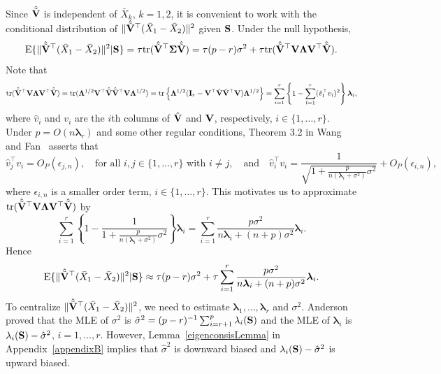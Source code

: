 \documentclass[times,sort&compress,3p]{elsarticle}
\newcommand{\mytr}{ {\rm tr} }
\newcommand{\myE}{ {\rm E} }
\newcommand{\bfsym}[1]{\ensuremath{\boldsymbol{#1}}}
\def\blambda {\bfsym {\lambda}}        \def\bLambda {\bfsym {\Lambda}}
\theoremstyle{plain}
\theoremstyle{definition}
\theoremstyle{remark}
\begin{document}
Since $\hat{\tilde{\mathbf{V}}}$ is independent of $\bar{X}_k$, $k=1,2$, it is convenient to work with the conditional distribution of $\|\hat{\tilde{\mathbf{V}}}^\top  (\bar{X}_1-\bar{X}_2)\|^2$ given $\mathbf{S}$. 
Under the null hypothesis, 
\begin{equation*}
    \myE \{ \|\hat{\tilde{\BV}}^\top  (\bar{X}_1-\bar{X}_2)\|^2 |\BS \}
        =
\tau \mytr(\hat{\tilde{\BV}}^\top \bSigma\hat{\tilde{\BV}})
        =
\tau (p-r) \sigma^2+
\tau \mytr(\hat{\tilde{\BV}}^\top \BV \bLambda \BV^\top \hat{\tilde{\BV}}).
\end{equation*}
Note that
\begin{equation*}
    \mytr(\hat{\tilde{\BV}}^\top \BV \bLambda \BV^\top \hat{\tilde{\BV}})
=
\mytr( \bLambda^{1/2} \BV^\top \hat{\tilde{\BV}}\hat{\tilde{\BV}}^\top \BV \bLambda^{1/2} )
=
\mytr\left\{ \bLambda^{1/2} (\BI_r-\BV^\top \hat{\BV}\hat{\BV}^\top \BV) \bLambda^{1/2} \right\}
    =
    \sum_{i=1}^r  \left\{1-\sum_{l=1}^r (\hat{v}_l^\top  v_i)^2 \right\} \blambda_i,
\end{equation*}
where $\hat{v}_i$ and $v_i$ are the $i$th columns of $\hat{\mathbf{V}}$ and $\mathbf{V}$, respectively, $i\in \{1,\ldots, r\}$.
Under $p=O(n\blambda_r)$ and some other regular conditions, Theorem 3.2 in Wang and Fan~\cite{Fan2015Asymptotics} asserts that 
\begin{equation}\label{yaofengla1}
    \hat{v}_j^\top  v_i=O_P(\epsilon_{j,n}),\quad \text{for all $i,j\in\{1,\ldots, r\}$ with $i\neq j$},
\quad \text{and}\quad
\hat{v}_i^\top  v_i=\frac{1}{\sqrt{1+ \frac{p}{n(\blambda_i+\sigma^2)}\sigma^2}}+O_P(\epsilon_{i,n}),
\end{equation}
where $\epsilon_{i,n}$ is a smaller order term, $i\in \{1,\ldots, r\}$.
This motivates us to approximate $\mytr(\hat{\tilde{\BV}}^\top \BV \bLambda \BV^\top \hat{\tilde{\BV}})$
by
$$
\sum_{i=1}^r \left\{ 1-\frac{1}{1+\frac{p}{n(\blambda_i+\sigma^2)}\sigma^2}\right\} \blambda_i
=
\sum_{i=1}^r \frac{p\sigma^2}{n\blambda_i+(n+p)\sigma^2}\blambda_i.
$$
Hence 
$$
\myE \{ \|\hat{\tilde{\BV}}^\top  (\bar{X}_1-\bar{X}_2)\|^2 |\BS \}
\approx
\tau(p-r)\sigma^2 + \tau\sum_{i=1}^r \frac{p\sigma^2}{n\blambda_i+(n+p)\sigma^2}\blambda_i.
$$
To centralize $\|\hat{\tilde{\mathbf{V}}}^\top  (\bar{X}_1-\bar{X}_2)\|^2$, we need to estimate $\blambda_1,\ldots, \blambda_r$ and $\sigma^2$.
Anderson~\cite{Anderson1986Asymptotic} proved that the MLE of $\sigma^2$ is $\hat{\sigma}^2=(p-r)^{-1}\sum_{i=r+1}^p \lambda_i(\mathbf{S})$ and the MLE of $\blambda_i$ is $\lambda_i(\mathbf{S})-\hat{\sigma}^2$, $i=1,\ldots, r$.
However, Lemma~\ref{eigenconsisLemma} in Appendix~\ref{appendixB} implies that $\hat{\sigma}^2$ is downward biased and $\lambda_i(\mathbf{S})-\hat{\sigma}^2$ is upward biased.
\end{document}

